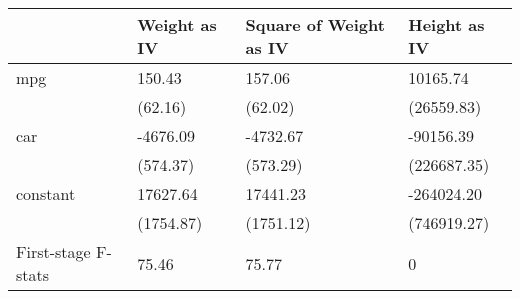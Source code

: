 \begin{tabular}{llll}
\toprule
{} & Weight as IV & Square of Weight as IV & Height as IV \\
\midrule
mpg                 &       150.43 &                 157.06 &     10165.74 \\
                    &      (62.16) &                (62.02) &   (26559.83) \\
car                 &     -4676.09 &               -4732.67 &    -90156.39 \\
                    &     (574.37) &               (573.29) &  (226687.35) \\
constant            &     17627.64 &               17441.23 &   -264024.20 \\
                    &    (1754.87) &              (1751.12) &  (746919.27) \\
First-stage F-stats &        75.46 &                  75.77 &            0 \\
\bottomrule
\end{tabular}
